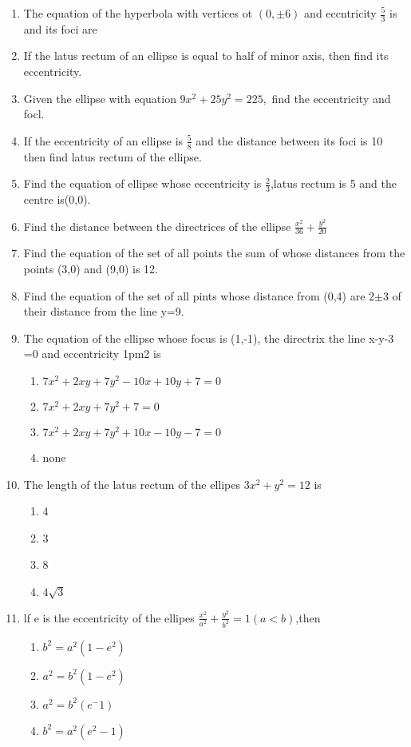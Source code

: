 \begin{enumerate}[label=\thesection.\arabic*,ref=\thesection.\theenumi,resume*]
\item The equation of the hyperbola with vertices ot $(0,\pm6)$ and eccntricity $\frac{5}{3}$ is and its foci are \makebox[1cm]{\hrulefill}
 \item If the latus rectum of an ellipse is equal to half of minor axis, then find its eccentricity.
 \item Given the ellipse with equation $9x^2+25y^2=225,$ find the eccentricity and focl.
 \item If the eccentricity of an ellipse is $\frac{5}{8}$ and  the distance between its foci is 10 then find latus rectum of the ellipse.
 \item Find the equation of ellipse whose eccentricity is $\frac{2}{3}$,latus rectum is 5 and the centre is(0,0).
 \item Find the distance between the directrices of the ellipse $\frac{x^2}{36}+\frac{y^2}{20}$
\item Find the equation of the set of all points the sum of whose distances  from the points (3,0) and (9,0) is 12.
\item Find the equation of the set of all pints whose distance from (0,4) are 2$\pm$3 of their distance from the line y=9.
\item The equation of the ellipse whose focus is (1,-1), the directrix the line x-y-3
=0 and eccentricity 1pm2 is
\begin{enumerate}
\item $7x^2+2xy+7y^2-10x+10y+7=0$
\item $7x^2+2xy+7y^2+7=0$
\item $7x^2+2xy+7y^2+10x-10y-7=0$ 
\item none
\end{enumerate}
\item The length of the latus rectum of the ellipes $3x^2+y^2=12$ is
\begin{enumerate}
\item 4
\item 3
\item 8
\item $4\sqrt{3}$
\end{enumerate}
\item lf e is the eccentricity of the ellipes $\frac{x^2}{a^2}+\frac{y^2}{b^2}=1(a<b)$,then
\begin{enumerate}
\item $b^2=a^2(1-e^2)$
\item $a^2=b^2(1-e^2)$
\item $a^2=b^2(e^-1)$
\item $b^2=a^2(e^2-1)$
\end{enumerate}
\end{enumerate}
